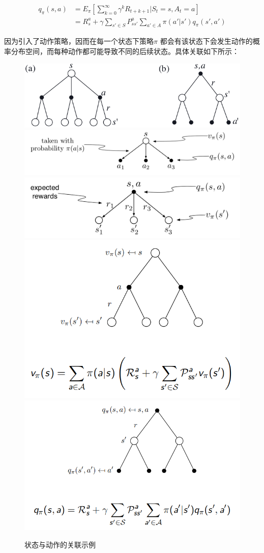 \documentclass[UTF8,a4paper,12pt]{ctexbook}
\begin{document}
				\begin{equation}
					\begin{aligned}
					q_\pi(s,a) &= E_\pi \left[\sum_{k=0}^{\infty}\gamma^k R_{t+k+1}|S_t = s, A_t = a \right]\\
							&= R_s^a + \gamma \sum_{s'\in S} P_{ss'}^a\sum_{a'\in A}\pi(a'|s')q_\pi(s', a')
					\end{aligned}
				\end{equation}
				
				因为引入了动作策略，因而在每一个状态下策略$\pi$ 都会有该状态下会发生动作的概率分布空间，而每种动作都可能导致不同的后续状态。具体关联如下所示：
				
				\begin{figure}[H]
					\centering
					\includegraphics[width=.7\linewidth]{qV}
					\includegraphics[width=.8\linewidth]{qV01}
					\includegraphics[width=.8\linewidth]{qV02}
					\includegraphics[width=.6\linewidth]{qV03}
					\includegraphics[width=.6\linewidth]{qV04}
					\caption{状态与动作的关联示例}
					\label{q(a,s)}
				\end{figure}
				
\end{document}
